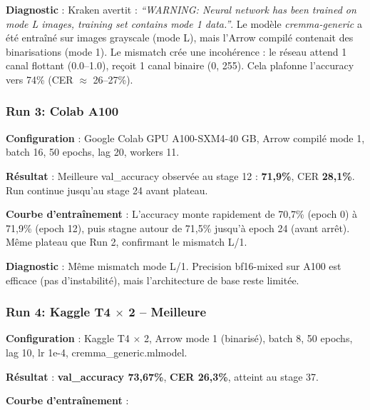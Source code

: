 ﻿\documentclass[twoside,twocolumn,10pt]{article}
\begin{document}
\textbf{Diagnostic} : Kraken avertit : \textit{``WARNING: Neural network has been trained on mode L images, training set contains mode 1 data.''}. Le modèle \textit{cremma-generic} a été entraîné sur images grayscale (mode L), mais l'Arrow compilé contenait des binarisations (mode 1). Le mismatch crée une incohérence : le réseau attend 1 canal flottant (0.0--1.0), reçoit 1 canal binaire (0, 255). Cela plafonne l'accuracy vers 74\% (CER $\approx$ 26--27\%).

\subsubsection{Run 3: Colab A100}

\textbf{Configuration} : Google Colab GPU A100-SXM4-40 GB, Arrow compilé mode 1, batch 16, 50 epochs, lag 20, workers 11.

\textbf{Résultat} : Meilleure val\_accuracy observée au stage 12 : \textbf{71,9\%}, CER \textbf{28,1\%}. Run continue jusqu'au stage 24 avant plateau.

\textbf{Courbe d'entraînement} : L'accuracy monte rapidement de 70,7\% (epoch 0) à 71,9\% (epoch 12), puis stagne autour de 71,5\% jusqu'à epoch 24 (avant arrêt). Même plateau que Run 2, confirmant le mismatch L/1.

\textbf{Diagnostic} : Même mismatch mode L/1. Precision bf16-mixed sur A100 est efficace (pas d'instabilité), mais l'architecture de base reste limitée.

\subsubsection{Run 4: Kaggle T4 $\times$ 2 -- \textbf{Meilleure}}

\textbf{Configuration} : Kaggle T4 $\times$ 2, Arrow mode 1 (binarisé), batch 8, 50 epochs, lag 10, lr 1e-4, cremma\_generic.mlmodel.

\textbf{Résultat} : \textbf{val\_accuracy 73,67\%}, \textbf{CER 26,3\%}, atteint au stage 37.

\textbf{Courbe d'entraînement} :
\end{document}
